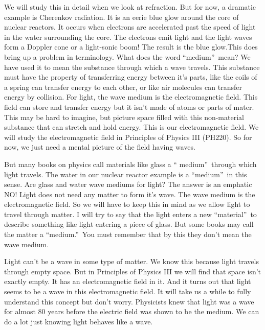 \documentclass{article}
\begin{document}
We will study this in detail when we look at refraction. But for now, a
dramatic example is Cherenkov radiation. It is an eerie blue glow around the
core of nuclear reactors. It occurs when electrons are accelerated past the
speed of light in the water surrounding the core. The electrons emit light
and the light waves form a Doppler cone or a light-sonic boom! The result is
the blue glow.This does bring up a problem in
terminology. What does the word \textquotedblleft medium\textquotedblright\
mean? We have used it to mean the substance through which a wave travels.
This substance must have the property of transferring energy between it's
parts, like the coils of a spring can transfer energy to each other, or like
air molecules can transfer energy by collision. For light, the wave medium
is the electromagnetic field. This field can store and transfer energy but
it isn't made of atoms or parts of mater. This may be hard to imagine, but
picture space filled with this non-material substance that can stretch and
hold energy. This is our electromagnetic field. We will study the
electromagnetic field in Principles of Physics III (PH220). So for now, we
just need a mental picture of the field having waves.

But many books on physics call materials like glass a \textquotedblleft
medium\textquotedblright\ through which light travels. The water in our
nuclear reactor example is a \textquotedblleft medium\textquotedblright\ in
this sense. Are glass and water wave mediums for light? The answer is an
emphatic NO! Light does not need any matter to form it's wave. The wave
medium is the electromagnetic field. So we will have to keep this in mind as
we allow light to travel through matter. I will try to say that the light
enters a new \textquotedblleft material\textquotedblright\ to describe
something like light entering a piece of glass. But some books may call the
matter a \textquotedblleft medium.\textquotedblright\ You must remember that
by this they don't mean the wave medium.

Light can't be a wave in some type of matter. We know this because light
travels through empty space. But in Principles of Physics III we will find
that space isn't exactly empty. It has an electromagnetic field in it. And
it turns out that light seems to be a wave in this electromagnetic field. It
will take us a while to fully understand this concept but don't worry.
Physicists knew that light was a wave for almost 80 years before the
electric field was shown to be the medium. We can do a lot just knowing
light behaves like a wave.
\end{document}
